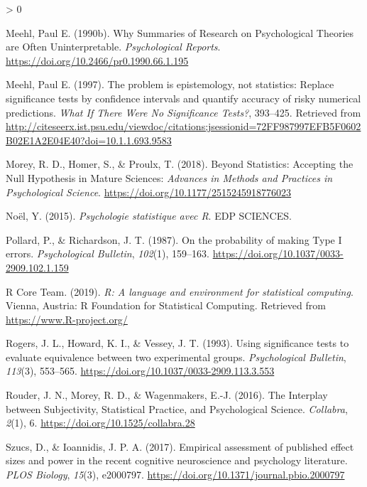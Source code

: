 \documentclass[
  a4paper,11pt,twoside,onecolumn,openright,final,oldfontcommands]{memoir}
\newlength{\cslhangindent}
\newenvironment{CSLReferences}[2] %
 {%
  \setlength{\parindent}{0pt}
  \ifodd #1 \everypar{\setlength{\hangindent}{\cslhangindent}}\ignorespaces\fi
  \ifnum #2 > 0
  \setlength{\parskip}{#2\baselineskip}
  \fi
 }%
 {}
\theoremstyle{definition}
\theoremstyle{definition}
\theoremstyle{definition}
\theoremstyle{remark}
\begin{document}
\begin{CSLReferences}{1}{0}
\leavevmode\hypertarget{ref-meehl_why_1990}{}%
Meehl, Paul E. (1990b). Why {Summaries} of {Research} on {Psychological} {Theories} are {Often} {Uninterpretable}. \emph{Psychological Reports}. \url{https://doi.org/10.2466/pr0.1990.66.1.195}

\leavevmode\hypertarget{ref-harlow_problem_1997}{}%
Meehl, Paul E. (1997). The problem is epistemology, not statistics: {Replace} significance tests by confidence intervals and quantify accuracy of risky numerical predictions. \emph{What If There Were No Significance Tests?}, 393--425. Retrieved from \url{http://citeseerx.ist.psu.edu/viewdoc/citations;jsessionid=72FF987997EFB5F0602B02E1A2E04E40?doi=10.1.1.693.9583}

\leavevmode\hypertarget{ref-morey_beyond_2018}{}%
Morey, R. D., Homer, S., \& Proulx, T. (2018). Beyond {Statistics}: {Accepting} the {Null} {Hypothesis} in {Mature} {Sciences}: \emph{Advances in Methods and Practices in Psychological Science}. \url{https://doi.org/10.1177/2515245918776023}

\leavevmode\hypertarget{ref-noel_psychologie_2015}{}%
Noël, Y. (2015). \emph{Psychologie statistique avec {R}}. EDP SCIENCES.

\leavevmode\hypertarget{ref-pollard_probability_1987}{}%
Pollard, P., \& Richardson, J. T. (1987). On the probability of making {Type} {I} errors. \emph{Psychological Bulletin}, \emph{102}(1), 159--163. \url{https://doi.org/10.1037/0033-2909.102.1.159}

\leavevmode\hypertarget{ref-R-base}{}%
R Core Team. (2019). \emph{R: A language and environment for statistical computing}. Vienna, Austria: R Foundation for Statistical Computing. Retrieved from \url{https://www.R-project.org/}

\leavevmode\hypertarget{ref-rogers_using_1993}{}%
Rogers, J. L., Howard, K. I., \& Vessey, J. T. (1993). Using significance tests to evaluate equivalence between two experimental groups. \emph{Psychological Bulletin}, \emph{113}(3), 553--565. \url{https://doi.org/10.1037/0033-2909.113.3.553}

\leavevmode\hypertarget{ref-rouder_interplay_2016}{}%
Rouder, J. N., Morey, R. D., \& Wagenmakers, E.-J. (2016). The {Interplay} between {Subjectivity}, {Statistical} {Practice}, and {Psychological} {Science}. \emph{Collabra}, \emph{2}(1), 6. \url{https://doi.org/10.1525/collabra.28}

\leavevmode\hypertarget{ref-szucs_empirical_2017-1}{}%
Szucs, D., \& Ioannidis, J. P. A. (2017). Empirical assessment of published effect sizes and power in the recent cognitive neuroscience and psychology literature. \emph{PLOS Biology}, \emph{15}(3), e2000797. \url{https://doi.org/10.1371/journal.pbio.2000797}


\end{CSLReferences}
\end{document}
